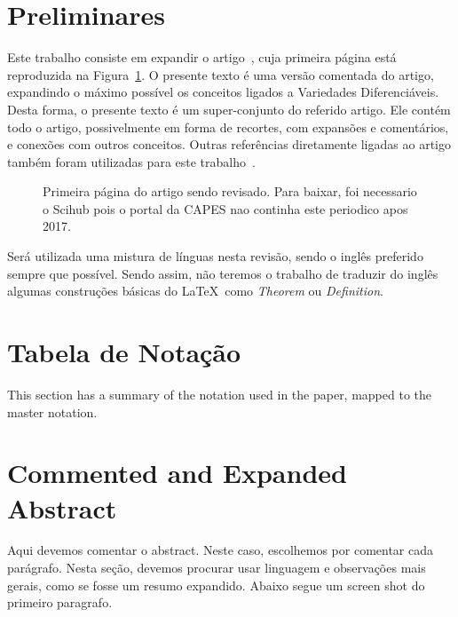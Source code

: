 \documentclass[a4paper,titlepage]{article}
\begin{document}


\section{Preliminares}

Este trabalho consiste em expandir o artigo~\cite{Pennec:AnnStat:2018},
cuja primeira página está reproduzida na Figura~\ref{fig:paper:page1}.
O presente texto é uma versão comentada do artigo,
expandindo o máximo possível os conceitos ligados a Variedades Diferenciáveis.
Desta forma, o presente texto é um super-conjunto do referido artigo.
Ele contém todo o artigo, possivelmente em forma de recortes, com expansões e
comentários, e conexões com outros conceitos. Outras referências diretamente
ligadas ao artigo também foram utilizadas para este
trabalho~\cite{Pennec:Advances:Chapter:2020,Sommer:Pennec:etal:2020}.

\begin{figure}
\centering
{}
\caption{%
Primeira página do artigo sendo revisado. Para baixar, foi necessario o Scihub
pois o portal da CAPES nao continha este periodico apos 2017.
}\label{fig:paper:page1}
\end{figure}

Será utilizada uma mistura de línguas nesta revisão, sendo o inglês preferido
sempre que possível. Sendo assim, não teremos o trabalho de traduzir do inglês
algumas construções básicas do \LaTeX\ como \emph{Theorem} ou
\emph{Definition}.


\section{Tabela de Notação}

This section has a summary of the notation used in the paper, 
mapped to the master notation.

\section{Commented and Expanded Abstract}

Aqui devemos comentar o abstract. Neste caso, escolhemos por comentar
cada parágrafo. Nesta seção, devemos procurar usar linguagem e observações mais
gerais, como se fosse um resumo expandido. Abaixo segue um screen shot do primeiro paragrafo.

{
\vspace{1em}
\vspace{1em}
}
\end{document}

